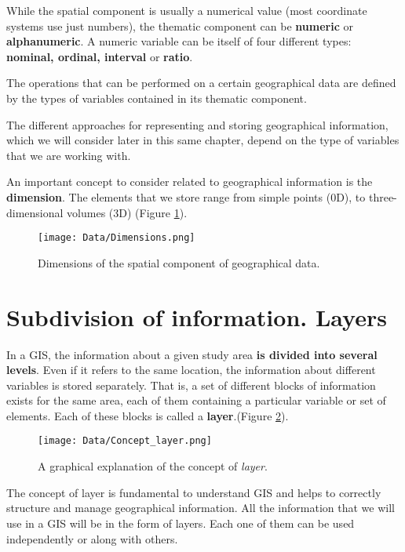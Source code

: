 While the spatial component is usually a numerical value (most coordinate systems use just numbers), the thematic component can be \textbf{numeric} or \textbf{alphanumeric}. A numeric variable can be itself of four different types: \textbf{nominal, ordinal, interval} or \textbf{ratio}.

The operations that can be performed on a certain geographical data are defined by the types of variables contained in its thematic component.

The different approaches for representing and storing geographical information, which we will consider later in this same chapter, depend on the type of variables that we are working with.

An important concept to consider related to geographical information is the \textbf{dimension}. The elements that we store range from simple points (0D), to three-dimensional volumes (3D) (Figure \ref{Fig:Dimensions}).

\begin{figure}[!hbt] 
\centering
\texttt{[image: Data/Dimensions.png]}
\caption{\small Dimensions of the spatial component of geographical data.}
\label{Fig:Dimensions} 
\end{figure}


\section{Subdivision of information. Layers}

In a GIS, the information about a given study area \textbf{is divided into several levels}. Even if it refers to the same location, the information about different variables is stored separately. That is, a set of different blocks of information exists for the same area, each of them containing a particular variable or set of elements. Each of these blocks is called a \textbf{layer}.(Figure \ref{Fig:Concept_layer}). 

\begin{figure}[!hbt] 
\centering
\texttt{[image: Data/Concept\_layer.png]}
\caption{\small A graphical explanation of the concept of \emph{layer}.}
\label{Fig:Concept_layer} 
\end{figure}

The concept of layer is fundamental to understand GIS and helps to correctly structure and manage geographical information. All the information that we will use in a GIS will be in the form of layers. Each one of them can be used independently or along with others.

